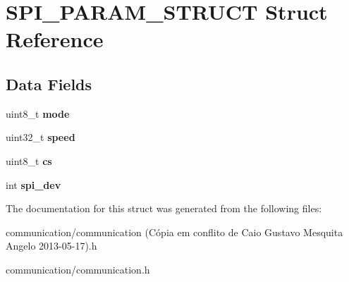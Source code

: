 \hypertarget{structSPI__PARAM__STRUCT}{
\section{SPI\_\-PARAM\_\-STRUCT Struct Reference}
\label{structSPI__PARAM__STRUCT}
}
\subsection*{Data Fields}
\begin{DoxyCompactItemize}
\item 
\hypertarget{structSPI__PARAM__STRUCT_a82c546c99f6c3daed73c1e23426be847}{
uint8\_\-t {\bfseries mode}}
\label{structSPI__PARAM__STRUCT_a82c546c99f6c3daed73c1e23426be847}

\item 
\hypertarget{structSPI__PARAM__STRUCT_a53a8d386594a81eb9bc6f971bfe36c54}{
uint32\_\-t {\bfseries speed}}
\label{structSPI__PARAM__STRUCT_a53a8d386594a81eb9bc6f971bfe36c54}

\item 
\hypertarget{structSPI__PARAM__STRUCT_ae0d62e0a5554783d710b677a017e246f}{
uint8\_\-t {\bfseries cs}}
\label{structSPI__PARAM__STRUCT_ae0d62e0a5554783d710b677a017e246f}

\item 
\hypertarget{structSPI__PARAM__STRUCT_abe385c44333d268d17cf648c8e371cad}{
int {\bfseries spi\_\-dev}}
\label{structSPI__PARAM__STRUCT_abe385c44333d268d17cf648c8e371cad}

\end{DoxyCompactItemize}


The documentation for this struct was generated from the following files:\begin{DoxyCompactItemize}
\item 
communication/communication (Cópia em conflito de Caio Gustavo Mesquita Angelo 2013-\/05-\/17).h\item 
communication/communication.h\end{DoxyCompactItemize}
